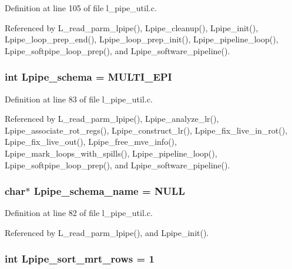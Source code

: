 Definition at line 105 of file l\_\-pipe\_\-util.c.

Referenced by L\_\-read\_\-parm\_\-lpipe(), Lpipe\_\-cleanup(), Lpipe\_\-init(), Lpipe\_\-loop\_\-prep\_\-end(), Lpipe\_\-loop\_\-prep\_\-init(), Lpipe\_\-pipeline\_\-loop(), Lpipe\_\-softpipe\_\-loop\_\-prep(), and Lpipe\_\-software\_\-pipeline().
\subsubsection{\setlength{\rightskip}{0pt plus 5cm}int \bf{Lpipe\_\-schema} = MULTI\_\-EPI}\label{l__pipe__util_8c_9929661b757af9845e6325f4752a7d87}




Definition at line 83 of file l\_\-pipe\_\-util.c.

Referenced by L\_\-read\_\-parm\_\-lpipe(), Lpipe\_\-analyze\_\-lr(), Lpipe\_\-associate\_\-rot\_\-regs(), Lpipe\_\-construct\_\-lr(), Lpipe\_\-fix\_\-live\_\-in\_\-rot(), Lpipe\_\-fix\_\-live\_\-out(), Lpipe\_\-free\_\-mve\_\-info(), Lpipe\_\-mark\_\-loops\_\-with\_\-spills(), Lpipe\_\-pipeline\_\-loop(), Lpipe\_\-softpipe\_\-loop\_\-prep(), and Lpipe\_\-software\_\-pipeline().
\subsubsection{\setlength{\rightskip}{0pt plus 5cm}char$\ast$ \bf{Lpipe\_\-schema\_\-name} = NULL}\label{l__pipe__util_8c_659205866ba47e73cc85c2376ecd1985}




Definition at line 82 of file l\_\-pipe\_\-util.c.

Referenced by L\_\-read\_\-parm\_\-lpipe(), and Lpipe\_\-init().
\subsubsection{\setlength{\rightskip}{0pt plus 5cm}int \bf{Lpipe\_\-sort\_\-mrt\_\-rows} = 1}\label{l__pipe__util_8c_1fd08397fdb9c8be171e9e45a1d811aa}




